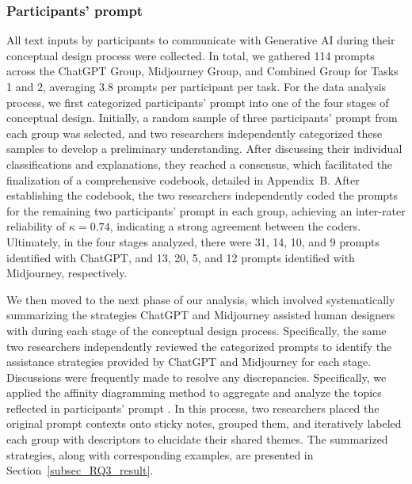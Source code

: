\documentclass{dsj}
\begin{document}
\subsubsection{Participants' prompt}
\label{subsubsection:prompt_analysis}
All text inputs by participants to communicate with Generative AI during their conceptual design process were collected. In total, we gathered 114 prompts across the ChatGPT Group, Midjourney Group, and Combined Group for Tasks 1 and 2, averaging 3.8 prompts per participant per task. For the data analysis process,  we first categorized participants' prompt into one of the four stages of conceptual design. Initially, a random sample of three participants' prompt from each group was selected, and two researchers independently categorized these samples to develop a preliminary understanding. After discussing their individual classifications and explanations, they reached a consensus, which facilitated the finalization of a comprehensive codebook, detailed in Appendix~B. After establishing the codebook, the two researchers independently coded the prompts for the remaining two participants' prompt in each group, achieving an inter-rater reliability of $\kappa = 0.74$, indicating a strong agreement between the coders. Ultimately, in the four stages analyzed, there were 31, 14, 10, and 9 prompts identified with ChatGPT, and 13, 20, 5, and 12 prompts identified with Midjourney, respectively.

We then moved to the next phase of our analysis, which involved systematically summarizing the strategies ChatGPT and Midjourney assisted human designers with during each stage of the conceptual design process. Specifically, the same two researchers independently reviewed the categorized prompts to identify the assistance strategies provided by ChatGPT and Midjourney for each stage. Discussions were frequently made to resolve any discrepancies. Specifically, we applied the affinity diagramming method to aggregate and analyze the topics reflected in participants' prompt \citep{holtzblatt1997contextual}. In this process, two researchers placed the original prompt contexts onto sticky notes, grouped them, and iteratively labeled each group with descriptors to elucidate their shared themes. The summarized strategies, along with corresponding examples, are presented in Section~\ref{subsec_RQ3_result}.


\end{document}
